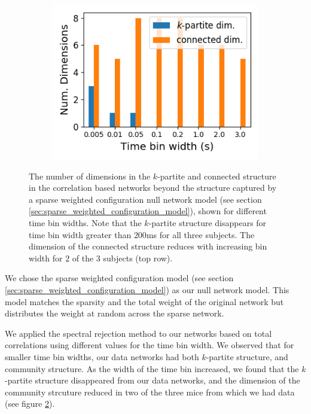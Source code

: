 \begin{figure}[h]
\begin{subfigure}[h]{0.5\linewidth}
      \centering
      \includegraphics[width=\linewidth]{figures/eight_probe/Robbins_rectified_total_structure_dims.png}
      \label{fig:Robbins_rectified_total_structure_dims}
    \end{subfigure}
    \caption{The number of dimensions in the $k$-partite and connected structure in the correlation based networks beyond the structure captured by a sparse weighted configuration null network model (see section \ref{sec:sparse_weighted_configuration_model}), shown for different time bin widths. Note that the $k$-partite structure disappears for time bin width greater than $200$ms for all three subjects. The dimension of the connected structure reduces with increasing bin width for $2$ of the $3$ subjects (top row).}
    \label{fig:structure_dims}
  \end{figure}

  We chose the sparse weighted configuration model (see section \ref{sec:sparse_weighted_configuration_model}) as our null network model. This model matches the sparsity and the total weight of the original network but distributes the weight at random across the sparse network.

  We applied the spectral rejection method to our networks based on total correlations using different values for the time bin width. We observed that for smaller time bin widths, our data networks had both $k$-partite structure, and community structure. As the width of the time bin increased, we found that the $k$-partite structure disappeared from our data networks, and the dimension of the community strcuture reduced in two of the three mice from which we had data (see figure \ref{fig:structure_dims}).

